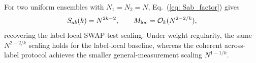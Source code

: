 \documentclass[aps,prx,reprint,superscriptaddress,amsmath,amssymb,longbibliography,floatfix]{revtex4-2}
\newcommand{\scD}{\mathcal{D}}
\newcommand{\scE}{\mathcal{E}}
\newcommand{\scO}{\mathcal{O}}
\theoremstyle{plain}
\newtheorem{theorem}{Theorem}[section]
\theoremstyle{definition}
\theoremstyle{remark}
\begin{document}
For two uniform ensembles with \(N_1=N_2=N\), Eq.~(\ref{eq: Sab_factor}) gives
\begin{equation}
    S_{ab}(k)=N^{2k-2},
    \qquad
    M_{\rm loc}=\scO_k(N^{2-2/k}),
\label{eq:app-uniform-local-baseline-recovery}
\end{equation}
recovering the label-local SWAP-test scaling. Under weight regularity, the same \(N^{2-2/k}\) scaling holds for the label-local baseline, whereas the coherent across-label protocol achieves the smaller general-measurement scaling \(N^{1-1/k}\).



\end{document}

